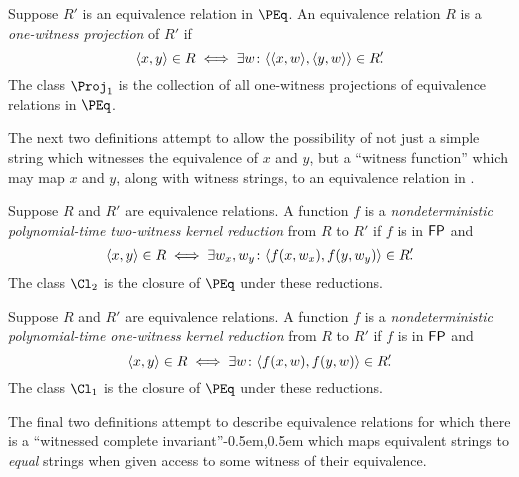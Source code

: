 \begin{definition}\label{def:npeq4}
  Suppose $R'$ is an equivalence relation in $\PEq$.
  An equivalence relation $R$ is a \emph{one-witness projection} of $R'$ if
  \begin{displaymath}
    \langle x,y\rangle \in R \iff \exists w \colon \langle\langle x,w\rangle,\langle y,w\rangle\rangle \in R'\kern-0.3em.
  \end{displaymath}
  The class $\Proj_1$ is the collection of all one-witness projections of equivalence relations in $\PEq$.
\end{definition}

The next two definitions attempt to allow the possibility of not just a simple string which witnesses the equivalence of $x$ and $y$, but a ``witness function'' which may map $x$ and $y$, along with witness strings, to an equivalence relation in \PEq.

\begin{definition}\label{def:npeq5}
  Suppose $R$ and $R'$ are equivalence relations.
  A function $f$ is a \emph{nondeterministic polynomial-time two-witness kernel reduction} from $R$ to $R'$ if $f$ is in ${\mathsf{FP}}$ and
  \begin{displaymath}
    \langle x,y\rangle \in R \iff \exists w_x, w_y \colon \langle f(x, w_x),f(y, w_y)\rangle \in R'\kern-0.3em.
  \end{displaymath}
  The class $\Cl_2$ is the closure of $\PEq$ under these reductions.
\end{definition}

\begin{definition}\label{def:npeq6}
  Suppose $R$ and $R'$ are equivalence relations.
  A function $f$ is a \emph{nondeterministic polynomial-time one-witness kernel reduction} from $R$ to $R'$ if $f$ is in ${\mathsf{FP}}$ and
  \begin{displaymath}
    \langle x,y\rangle \in R \iff \exists w \colon \langle f(x, w),f(y, w)\rangle \in R'\kern-0.3em.
  \end{displaymath}
  The class $\Cl_1$ is the closure of $\PEq$ under these reductions.
\end{definition}

The final two definitions attempt to describe equivalence relations for which there is a ``witnessed complete invariant''\kern-0.5em,\kern0.5em which maps equivalent strings to \emph{equal} strings when given access to some witness of their equivalence.

